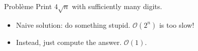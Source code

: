 \begin{frame}
    \frametitle{\problemtitle}
    \begin{block}{Problème}
        Print $4\sqrt n$ with sufficiently many digits.
    \end{block}
    \pause
    \begin{itemize}
        \item<+-> Naive solution: do something stupid. $\mathcal O(2^n)$ is too slow!
        \item<+-> Instead, just compute the answer. $\mathcal O(1)$.
    \end{itemize}
\end{frame}
